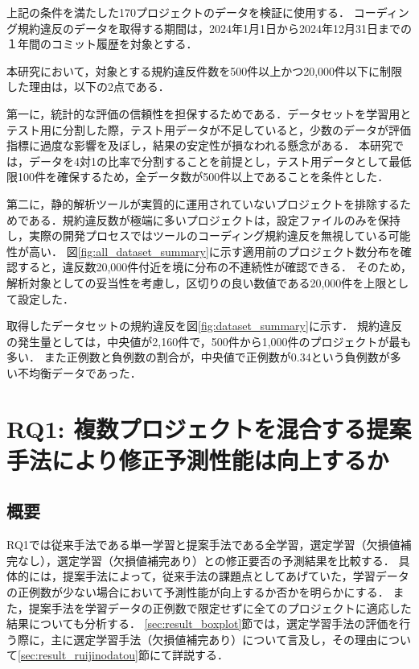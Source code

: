 \documentclass[11pt]{jreport}
\begin{document}
上記の条件を満たした170プロジェクトのデータを検証に使用する．
コーディング規約違反のデータを取得する期間は，2024年1月1日から2024年12月31日までの１年間のコミット履歴を対象とする．

本研究において，対象とする規約違反件数を500件以上かつ20,000件以下に制限した理由は，以下の2点である．

第一に，統計的な評価の信頼性を担保するためである．データセットを学習用とテスト用に分割した際，テスト用データが不足していると，少数のデータが評価指標に過度な影響を及ぼし，結果の安定性が損なわれる懸念がある．
本研究では，データを4対1の比率で分割することを前提とし，テスト用データとして最低限100件を確保するため，全データ数が500件以上であることを条件とした．

第二に，静的解析ツールが実質的に運用されていないプロジェクトを排除するためである．規約違反数が極端に多いプロジェクトは，設定ファイルのみを保持し，実際の開発プロセスではツールのコーディング規約違反を無視している可能性が高い．
図\ref{fig:all_dataset_summary}に示す適用前のプロジェクト数分布を確認すると，違反数20,000件付近を境に分布の不連続性が確認できる．
そのため，解析対象としての妥当性を考慮し，区切りの良い数値である20,000件を上限として設定した．

取得したデータセットの規約違反を図\ref{fig:dataset_summary}に示す．
規約違反の発生量としては，中央値が2,160件で，500件から1,000件のプロジェクトが最も多い．
また正例数と負例数の割合が，中央値で正例数が0.34という負例数が多い不均衡データであった．


\chapter{RQ1: 複数プロジェクトを混合する提案手法により修正予測性能は向上するか}\label{chap:rq1}

\section{概要}

RQ1では従来手法である単一学習と提案手法である全学習，選定学習（欠損値補完なし），選定学習（欠損値補完あり）との修正要否の予測結果を比較する．
具体的には，提案手法によって，従来手法の課題点としてあげていた，学習データの正例数が少ない場合において予測性能が向上するか否かを明らかにする．
また，提案手法を学習データの正例数で限定せずに全てのプロジェクトに適応した結果についても分析する．
\ref{sec:result_boxplot}節では，選定学習手法の評価を行う際に，主に選定学習手法（欠損値補完あり）について言及し，その理由について\ref{sec:result_ruijinodatou}節にて詳説する．
\end{document}
